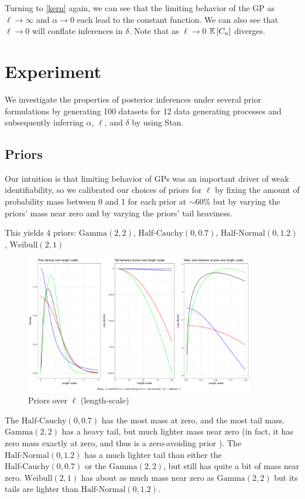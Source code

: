 \documentclass{article}
\newcommand{\Exp}[1]{\ensuremath{\mathbb{E} \lb #1 \rb}}
\newcommand{\lb}{\ensuremath{\left[}}
\newcommand{\rb}{\ensuremath{\right]}}
\begin{document}
Turning to \ref{kern} again, we can see that the limiting behavior of the GP
as $\ell \rightarrow \infty$ and $\alpha \rightarrow 0$ each lead to the constant
function. We can also see that $\ell \rightarrow 0$ will conflate inferences in $\delta$.
Note that as $\ell \rightarrow 0$ $\Exp{C_u}$ diverges.   

\section{Experiment} \label{experiment}

We investigate the properties of posterior inferences under several prior
formulations by generating 100 datasets for 12 data generating processes and
subsequently inferring $\alpha$, $\ell$, and $\delta$ by using Stan.

\subsection{Priors}

Our intuition is that limiting behavior of GPs was an important driver of weak
identifiability, so we calibrated our choices of priors for $\ell$ by fixing
the amount of probability mass between 0 and 1 for each prior at $\sim60\%$ but
by varying the priors' mass near zero and by varying the priors' tail
heaviness.

This yields 4 priors: $\text{Gamma}(2, 2)$, $\text{Half-Cauchy}(0, 0.7)$,
$\text{Half-Normal}(0, 1.2)$, $\text{Weibull}(2, 1)$

\begin{figure}[h]
  \centering
  \includegraphics[width=100mm]{plots/prior_0_4_chart.pdf}
  \caption{Priors over $\ell$ (length-scale)}
\end{figure}

The $\text{Half-Cauchy}(0, 0.7)$ has the most mass at zero, and the most tail
mass. $\text{Gamma}(2, 2)$ has a heavy tail, but much lighter mass near zero
(in fact, it has zero mass exactly at zero, and thus is a zero-avoiding prior
\citet{gelman2014bayesian}). The $\text{Half-Normal}(0, 1.2)$ has a much lighter tail than
either the $\text{Half-Cauchy}(0, 0.7)$ or the $\text{Gamma}(2, 2)$, but still
has quite a bit of mass near zero. $\text{Weibull}(2, 1)$ has about as much
mass near zero as $\text{Gamma}(2, 2)$ but its tails are lighter than
$\text{Half-Normal}(0, 1.2)$.
\end{document}
